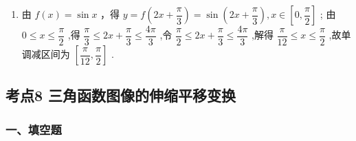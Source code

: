 \begin{enumerate}
\begin{jieda}
\begin{enumerate}
            \item 由 $f\left( x\right)  = \sin x$ ，得 $y = f\left( {{2x} + \dfrac{\pi }{3}}\right)  = \sin \left( {{2x} + \dfrac{\pi }{3}}\right) ,x \in  \left\lbrack  {0,\dfrac{\pi }{2}}\right\rbrack$ ; 由 $0 \leq  x \leq  \dfrac{\pi }{2}$ ,得 $\dfrac{\pi }{3} \leq  {2x} + \dfrac{\pi }{3} \leq  \dfrac{4\pi }{3}$ ,令 $\dfrac{\pi }{2} \leq  {2x} +  \dfrac{\pi }{3} \leq  \dfrac{4\pi }{3}$ ,解得 $\dfrac{\pi }{12} \leq  x \leq  \dfrac{\pi }{2}$ ,故单调减区间为 $\left\lbrack  {\dfrac{\pi }{12},\dfrac{\pi }{2}}\right\rbrack$ .
        \end{enumerate}
    \end{jieda}
\end{enumerate}
\subsection*{考点8 三角函数图像的伸缩平移变换}

\subsubsection*{一、填空题}

